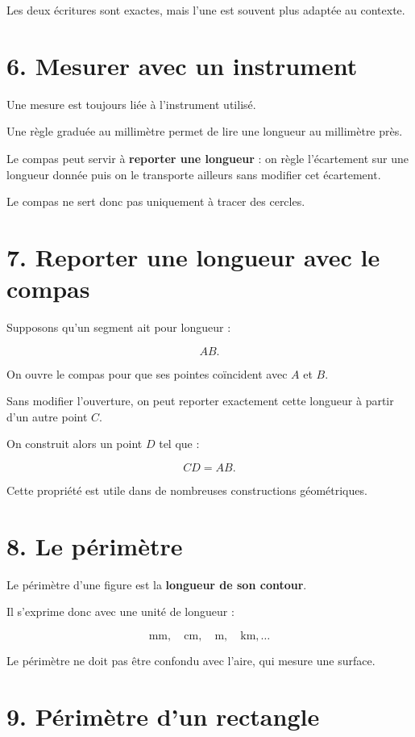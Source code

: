 Les deux écritures sont exactes, mais l’une est souvent plus adaptée au contexte.

\section{6. Mesurer avec un instrument}

Une mesure est toujours liée à l’instrument utilisé.

Une règle graduée au millimètre permet de lire une longueur au millimètre près.

Le compas peut servir à \textbf{reporter une longueur} : on règle l’écartement sur une longueur donnée puis on le transporte ailleurs sans modifier cet écartement.

Le compas ne sert donc pas uniquement à tracer des cercles.

\section{7. Reporter une longueur avec le compas}

Supposons qu’un segment ait pour longueur :

\[
AB.
\]

On ouvre le compas pour que ses pointes coïncident avec $A$ et $B$.

Sans modifier l’ouverture, on peut reporter exactement cette longueur à partir d’un autre point $C$.

On construit alors un point $D$ tel que :

\[
CD=AB.
\]

Cette propriété est utile dans de nombreuses constructions géométriques.

\section{8. Le périmètre}

Le périmètre d’une figure est la \textbf{longueur de son contour}.

Il s’exprime donc avec une unité de longueur :

\[
\text{mm},\quad \text{cm},\quad \text{m},\quad \text{km},\ldots
\]

Le périmètre ne doit pas être confondu avec l’aire, qui mesure une surface.

\section{9. Périmètre d’un rectangle}

